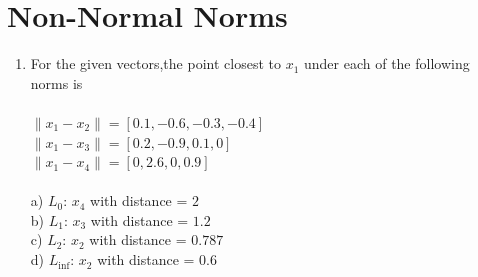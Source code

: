 \documentclass[english]{article}
\begin{document}
\section{Non-Normal Norms}

\begin{enumerate}
\item

For the given vectors,the point closest to $x_1$ under each of the following norms is \\\\
$\lVert x_1 - x_2 \rVert = [0.1, -0.6, -0.3, -0.4]$ \\
$\lVert x_1 - x_3 \rVert = [0.2, -0.9, 0.1, 0]$ \\
$\lVert x_1 - x_4 \rVert = [0, 2.6, 0, 0.9]$ \\ \\

a) $L_0$: $x_4$ with distance = $2$ \\
b) $L_1$:  $x_3$ with distance =  $1.2$\\
c) $L_2$: $x_2$ with distance = $0.787$ \\
d) $L_{\inf}$: $x_2$ with distance =  $0.6$\\


\end{enumerate}
\end{document}

